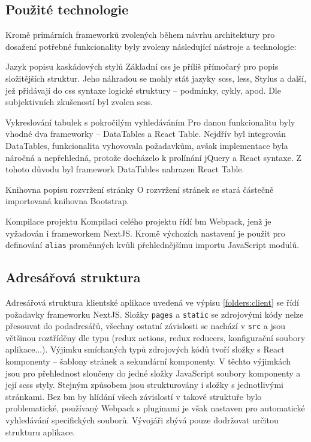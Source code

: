 \subsection{Použité technologie}

Kromě primárních frameworků zvolených během návrhu architektury pro dosažení potřebné funkcionality byly zvoleny následující nástroje a technologie:

\begin{dl}
   \item [Jazyk popisu kaskádových stylů] Základní \gls{css} je příliš přímočarý pro popis složitějších struktur. Jeho náhradou se mohly stát jazyky \gls{scss}, \gls{less}, Stylus a další, jež přidávají do \gls{css} syntaxe logické struktury -- podmínky, cykly, apod. Dle subjektivních zkušeností byl zvolen \gls{scss}.
   
   \item [Vykreslování tabulek s pokročilým vyhledáváním] Pro danou funkcionalitu byly vhodné dva frameworky -- DataTables a React Table. Nejdřív byl integrován DataTables, funkcionalita vyhovovala požadavkům, avšak implementace byla náročná a nepřehledná, protože docházelo k prolínání jQuery a React syntaxe. Z tohoto důvodu byl framework DataTables nahrazen React Table.
   
   \item [Knihovna popisu rozvržení stránky] O rozvržení stránek se stará částečně importovaná knihovna Bootstrap.
   
   \item [Kompilace projektu] Kompilaci celého projektu řídí \gls{bm} Webpack, jenž je vyžadován i frameworkem NextJS. Kromě výchozích nastavení je použit pro definování \texttt{alias} proměnných kvůli přehlednějšímu importu JavaScript modulů.
\end{dl}



\subsection{Adresářová struktura}

Adresářová struktura klientské aplikace uvedená ve výpisu \ref{folders:client} se řídí požadavky frameworku \mbox{NextJS}. Složky \texttt{pages} a \texttt{static} se zdrojovými kódy nelze přesouvat do podadresářů, všechny ostatní závislosti se nachází v \texttt{src} a jsou většinou roztříděny dle typu (redux actions, redux reducers, konfigurační soubory aplikace...). Výjimku smíchaných typů zdrojových kódů tvoří složky s React komponenty -- šablony stránek a sekundární komponenty. V těchto výjimkách jsou pro přehlednost sloučeny do jedné složky JavaScript soubory komponenty a její \gls{scss} styly. Stejným způsobem jsou strukturovány i složky s jednotlivými stránkami. Bez \gls{bm} by hlídání všech závislostí v takové struktuře bylo problematické, používaný Webpack s pluginami je však nastaven pro automatické vyhledávání specifických souborů. Vývojáři zbývá pouze dodržovat určitou strukturu aplikace.

